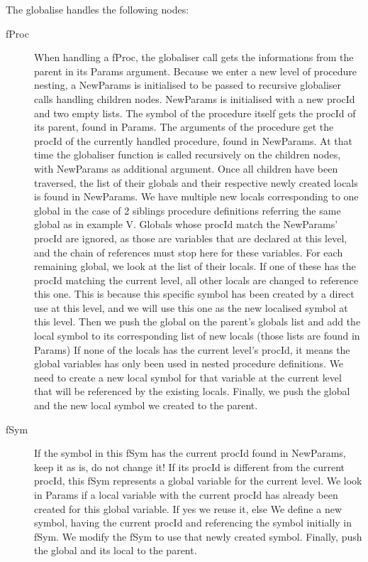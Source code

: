 \documentclass[a4paper]{memoir}
\begin{document}
The globalise handles the following nodes:
\begin{description}
   \item[fProc] When handling a fProc, the globaliser call gets the informations from the parent in its Params argument. Because we enter a new level of procedure nesting, a NewParams is initialised to be passed to recursive globaliser calls handling children nodes. NewParams is initialised with a new procId and two empty lists. 
      The symbol of the procedure itself gets the procId of its parent, found in Params. The arguments of the procedure get the procId of the currently handled procedure, found in NewParams. At that time the globaliser function is called recursively on the children nodes, with NewParams as additional argument.
      Once all children have been traversed, the list of their globals and their respective newly created locals is found in NewParams.  We have multiple new locals corresponding to one global in the case of 2 siblings procedure definitions referring the same global as in example V. 
      Globals whose procId match the NewParams' procId are ignored, as those are variables that are declared at this level, and the chain of references must stop here for these variables.
      For each remaining global, we look at the list of their locals. 
      If one of these has the procId matching the current level, all other locals are changed to reference this one. This is because this specific symbol has been created by a direct use at this level, and we will use this one as the new localised symbol at this level. Then we push the global on the parent's globals list and add the local symbol to its corresponding list of new locals (those lists are found in Params)
      If none of the locals has the current level's procId, it means the global variables has only been used in nested procedure definitions. We need to create a new local symbol for that variable at the current level that will be referenced by the existing locals. Finally, we push the global and the new local symbol we created to the parent. 
   \item[fSym] If the symbol in this fSym has the current procId found in NewParams, keep it as is, do not change it! 
      If its procId is different from the current procId, this fSym represents a global variable for the current level. We look in Params if a local variable with the current procId has already been created for this global variable. If yes we reuse it, else We define a new symbol, having the current procId and referencing the symbol initially in fSym. We modify the fSym to use that newly created symbol. Finally, push the global and its local to the parent.
      
\end{description}
\end{document}
